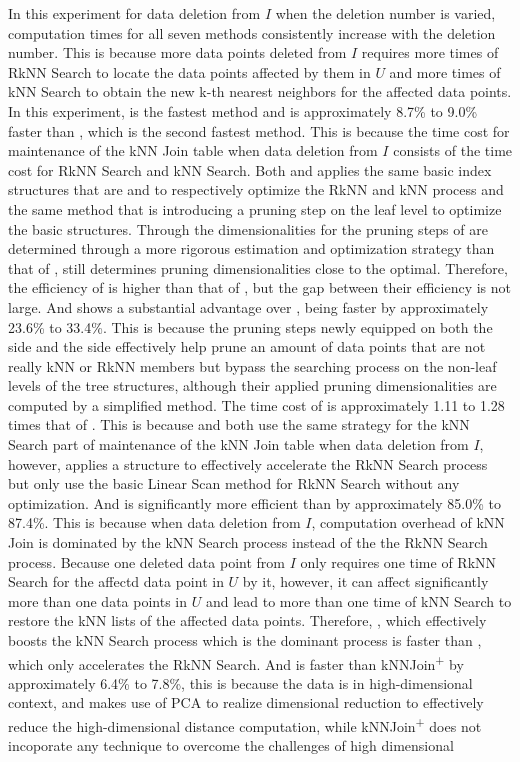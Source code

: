 In this experiment for data deletion from $I$ when the deletion number is varied, computation times for all seven methods consistently increase with the deletion number. This is because more data points deleted from $I$ requires more times of RkNN Search to locate the data points affected by them in $U$ and more times of kNN Search to obtain the new k-th nearest neighbors for the affected data points. In this experiment, \cpdualtree is the fastest method and is approximately 8.7\% to 9.0\% faster than \spdualtree, which is the second fastest method. This is because the time cost for maintenance of the kNN Join table when data deletion from $I$ consists of the time cost for RkNN Search and kNN Search. Both \cpdualtree and \spdualtree applies the same basic index structures that are \hdrtree and \deltatree to respectively optimize the RkNN and kNN process and the same method that is introducing a pruning step on the leaf level to optimize the basic structures. Through the dimensionalities for the pruning steps of \cpdualtree are determined through a more rigorous estimation and optimization strategy than that of \spdualtree, \spdualtree still determines pruning dimensionalities close to the optimal. Therefore, the efficiency of \cpdualtree is higher than that of \spdualtree, but the gap between their efficiency is not large. And \spdualtree shows a substantial advantage over \dualtree, being faster by approximately 23.6\% to 33.4\%. This is because the pruning steps newly equipped on both the \hdrtree side and the \deltatree side effectively help prune an amount of data points that are not really kNN or RkNN members but bypass the searching process on the non-leaf levels of the tree structures, although their applied pruning dimensionalities are computed by a simplified method. The time cost of \deltatree is approximately 1.11 to 1.28 times that of \dualtree. This is because \deltatree and \dualtree both use the same strategy for the kNN Search part of maintenance of the kNN Join table when data deletion from $I$, however, \dualtree applies a \hdrtree structure to effectively accelerate the RkNN Search process but \deltatree only use the basic Linear Scan method for RkNN Search without any optimization. And \deltatree is significantly more efficient than \hdrtree by approximately 85.0\% to 87.4\%. This is because when data deletion from $I$, computation overhead of kNN Join is dominated by the kNN Search process instead of the the RkNN Search process. Because one deleted data point from $I$ only requires one time of RkNN Search for the affectd data point in $U$ by it, however, it can affect significantly more than one data points in $U$ and lead to more than one time of kNN Search to restore the kNN lists of the affected data points. Therefore, \deltatree, which effectively boosts the kNN Search process which is the dominant process is faster than \hdrtree, which only accelerates the RkNN Search. And \hdrtree is faster than kNNJoin\textsuperscript{+} by approximately 6.4\% to 7.8\%, this is because the data is in high-dimensional context, and \hdrtree makes use of PCA to realize dimensional reduction to effectively reduce the high-dimensional distance computation, while kNNJoin\textsuperscript{+} does not incoporate any technique to overcome the challenges of high dimensional 